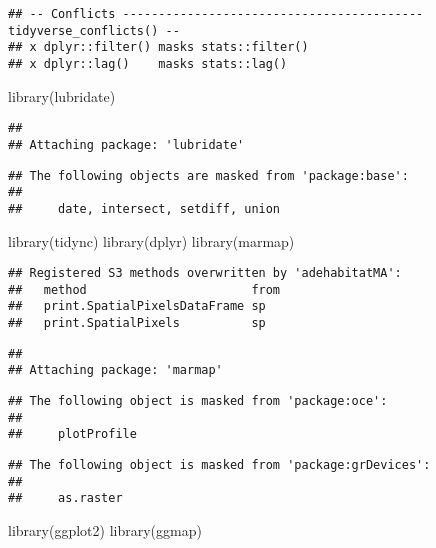 \documentclass[]{tufte-handout}
\newenvironment{Shaded}{}{}
\newcommand{\FunctionTok}[1]{\textcolor[rgb]{0.02,0.16,0.49}{#1}}
\newcommand{\NormalTok}[1]{#1}
\begin{document}
\begin{verbatim}
## -- Conflicts ------------------------------------------ tidyverse_conflicts() --
## x dplyr::filter() masks stats::filter()
## x dplyr::lag()    masks stats::lag()
\end{verbatim}

\begin{Shaded}
\begin{Highlighting}[]
\FunctionTok{library}\NormalTok{(lubridate)}
\end{Highlighting}
\end{Shaded}

\begin{verbatim}
## 
## Attaching package: 'lubridate'
\end{verbatim}

\begin{verbatim}
## The following objects are masked from 'package:base':
## 
##     date, intersect, setdiff, union
\end{verbatim}

\begin{Shaded}
\begin{Highlighting}[]
\FunctionTok{library}\NormalTok{(tidync)}
\FunctionTok{library}\NormalTok{(dplyr)}
\FunctionTok{library}\NormalTok{(marmap)}
\end{Highlighting}
\end{Shaded}

\begin{verbatim}
## Registered S3 methods overwritten by 'adehabitatMA':
##   method                       from
##   print.SpatialPixelsDataFrame sp  
##   print.SpatialPixels          sp
\end{verbatim}

\begin{verbatim}
## 
## Attaching package: 'marmap'
\end{verbatim}

\begin{verbatim}
## The following object is masked from 'package:oce':
## 
##     plotProfile
\end{verbatim}

\begin{verbatim}
## The following object is masked from 'package:grDevices':
## 
##     as.raster
\end{verbatim}

\begin{Shaded}
\begin{Highlighting}[]
\FunctionTok{library}\NormalTok{(ggplot2)}
\FunctionTok{library}\NormalTok{(ggmap)}
\end{Highlighting}
\end{Shaded}
\end{document}
